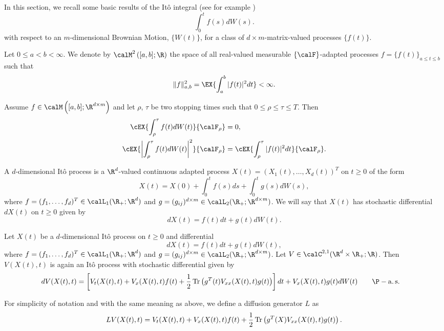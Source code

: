 
	In this section, we recall some basic results of the It\^o integral (see for example \cite{kuo05})
$$
	\int_{0}^{t}
		f(s)dW(s).
$$
with respect to an $m$-dimensional Brownian Motion, $\{W(t)\}$, for a class of $d \times m$-matrix-valued processes
$\{f(t)\}$.
\begin{definition} %
	Let $0\leq a<b<\infty$. We denote by $\calM^2\left([a,b];\R \right)$ the space of all real-valued measurable
	$\{\calF\}$-adapted processes $f=\{f(t)\}_{a\leq t\leq b}$ such that
	$$
		\|f\|_{a,b}^2
			=\EX{
				\int_a^b |f(t)|^2dt
				}<\infty.
	$$
\end{definition}
\begin{thm}
	Assume $f\in \calM \left([a,b]; \R^{d\times m}\right)$ and let $\rho$, $\tau$ be two stopping times such that
	$0\leq \rho \leq \tau \leq T$. Then
	\begin{align*}
		\cEX{\int_{\rho}^{\tau} f(t) dW(t)}{\calF_{\rho}}
			& = 0,\\
		\cEX{\left|\int_{\rho}^{\tau} f(t)dW(t) \right|^2}{\calF_{\rho}}
			& = \cEX{\int_{\rho}^{\tau}|f(t)|^2dt }{\calF_{\rho}}.
	\end{align*}
\end{thm}
\begin{definition}[It\^o process]
	A $d$-dimensional It\^o process is a $\R^d$-valued continuous adapted
	process $X(t) = (X_1(t), \dots, X_d(t))^T$ on $t\geq 0$ of the form
	$$
		X(t) = X(0) +  \int_{0}^{t} f(s)ds + \int_{0}^{t} g(s)dW(s),
	$$
	where $f = (f_1,\ldots, f_d)^T \in  \calL_1(\R_+; \R^d)$ and 
	$g = (g_{ij})^{d\times m}\in \calL_2(\R_+; \R^{d\times m})$. We will say that $X(t)$ has stochastic differential 
	$dX(t)$ on $t \geq 0$ given by
	$$
		dX(t) = f(t) dt + g(t)dW(t).
	$$
\end{definition}
%
\begin{thm}
	Let $X(t)$ be a $d$-dimensional It\^o process on $t \geq 0$ and differential
	$$
		dX(t) = f(t) dt + g(t)dW(t),
	$$
	where $f = (f_1,\ldots, f_d)^T \in  \calL_1(\R_+; \R^d)$ and 
	$g = (g_{ij})^{d\times m}\in \calL_2(\R_+; \R^{d\times m})$.
	Let $V\in \calC^{2,1}(\R^d\times \R_+;\R)$. Then $V(X(t),t)$ is again an It\^o process with stochastic differential
	given by
	\begin{align*}
		dV(X(t),t) &=
			\left[
				V_t(X(t),t) + V_x(X(t),t)f(t)
				+\frac{1}{2}
				\Tr
					\left(
						g^T(t) V_{xx}(X(t),t)g(t)
					\right)
			\right]dt
			+
			V_x(X(t),t) g(t)dW(t) \qquad \P-\as
	\end{align*}
\end{thm}
For simplicity of notation and with the same meaning as above, we define a diffusion generator $L$ as
\begin{equation}\label{eqn:DifussionOperator}
LV(X(t),t)=
V_t(X(t),t) + V_x(X(t),t)f(t)
+\frac{1}{2}
\Tr
	\left(
		g^T(X) V_{xx}(X(t), t)g(t)
	\right).
\end{equation}
